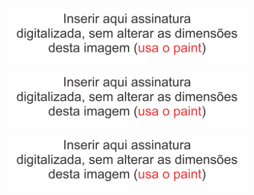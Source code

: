 \begin{center}
	\includegraphics[scale=1]{Digitalizado/assinaturaOrientador.png}\\
	\includegraphics[scale=1]{Digitalizado/assinaturaAvaliador01.png}\\
	\includegraphics[scale=1]{Digitalizado/assinaturaAvaliador02.png}
\end{center}

\newpage